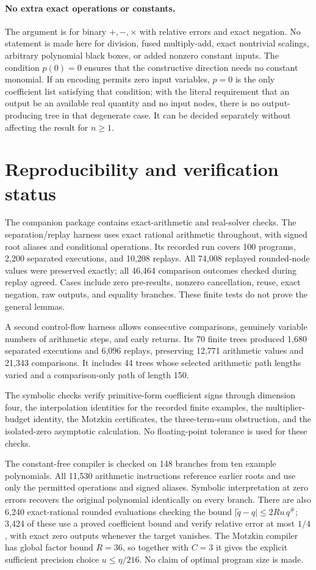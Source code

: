 \documentclass[11pt,a4paper]{article}
\theoremstyle{definition}
\theoremstyle{remark}
\newcommand{\abs}[1]{\lvert #1\rvert}
\newcommand{\maj}[1]{#1^{\#}}
\begin{document}
\paragraph{No extra exact operations or constants.}
The argument is for binary $+,-,\times$ with relative errors and exact
negation. No statement is made here for division, fused multiply-add, exact
nontrivial scalings, arbitrary polynomial black boxes, or added nonzero
constant inputs. The condition $p(0)=0$ ensures that the constructive direction
needs no constant monomial. If an encoding permits zero input variables,
$p=0$ is the only coefficient list satisfying that condition; with the literal
requirement that an output be an available real quantity and no input nodes,
there is no output-producing tree in that degenerate case. It can be decided
separately without affecting the result for $n\ge1$.

\section{Reproducibility and verification status}

The companion package contains exact-arithmetic and real-solver checks. The
separation/replay harness uses exact rational arithmetic throughout, with
signed root aliases and conditional operations. Its recorded run covers
100 programs, 2,200 separated executions, and 10,208 replays. All 74,008
replayed rounded-node values were preserved exactly; all 46,464 comparison
outcomes checked during replay agreed. Cases include zero pre-results,
nonzero cancellation, reuse, exact negation, raw outputs, and equality
branches. These finite tests do not prove the general lemmas.

A second control-flow harness allows consecutive comparisons, genuinely
variable numbers of arithmetic steps, and early returns. Its 70 finite trees
produced 1,680 separated executions and 6,096 replays, preserving 12,771
arithmetic values and 21,343 comparisons. It includes 44 trees whose selected
arithmetic path lengths varied and a comparison-only path of length 150.

The symbolic checks verify primitive-form coefficient signs through dimension
four, the interpolation identities for the recorded finite examples, the
multiplier-budget identity, the Motzkin certificates, the three-term-sum
obstruction, and the isolated-zero asymptotic calculation. No floating-point
tolerance is used for these checks.


The constant-free compiler is checked on 148 branches from ten example
polynomials. All 11,530 arithmetic instructions reference earlier roots and use
only the permitted operations and signed aliases. Symbolic interpretation at
zero errors recovers the original polynomial identically on every branch.
There are also 6,240 exact-rational rounded evaluations checking the bound
$\abs{\widetilde q-q}\le2Ru\,\maj q$; 3,424 of these use a proved coefficient
bound and verify relative error at most $1/4$, with exact zero outputs whenever
the target vanishes. The Motzkin compiler has global factor bound $R=36$, so
together with $C=3$ it gives the explicit sufficient precision choice
$u\le\eta/216$. No claim of optimal program size is made.
\end{document}
